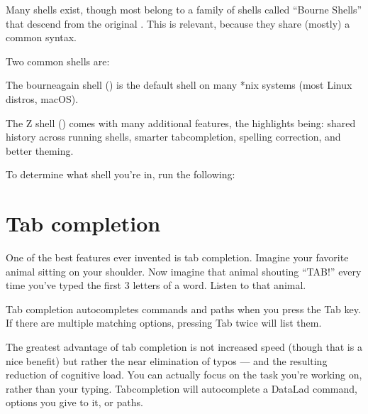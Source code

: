 \sphinxAtStartPar
Many shells exist, though most belong to a family of shells called “Bourne Shells”
that descend from the original . This is relevant, because they share (mostly)
a common syntax.

\sphinxAtStartPar
Two common shells are:
\begin{description}
\sphinxAtStartPar
The bourne\sphinxhyphen{}again shell () is the default shell on many *nix systems (most Linux distros, macOS).

\sphinxAtStartPar
The Z shell () comes with many additional features, the highlights being:
shared history across running shells, smarter tab\sphinxhyphen{}completion, spelling correction, and better theming.

\end{description}

\sphinxAtStartPar
To determine what shell you’re in, run the following:

\begin{sphinxVerbatim}[commandchars=\\\{\}]
\end{sphinxVerbatim}

\ignorespaces 

\section{Tab completion}
\label{\detokenize{intro/howto:tab-completion}}\label{\detokenize{intro/howto:index-6}}
\sphinxAtStartPar
One of the best features ever invented is tab completion. Imagine your favorite animal sitting
on your shoulder. Now imagine that animal shouting “TAB!” every time you’ve typed the first
3 letters of a word. Listen to that animal.

\sphinxAtStartPar
Tab completion autocompletes commands and paths when you press the Tab key.
If there are multiple matching options, pressing Tab twice will list them.

\sphinxAtStartPar
The greatest advantage of tab completion is not increased speed (though that is a nice benefit)
but rather the near elimination of typos — and the resulting reduction of cognitive load.
You can actually focus on the task you’re working on, rather than your typing. Tab\sphinxhyphen{}completion
will autocomplete a DataLad command, options you give to it, or paths.

